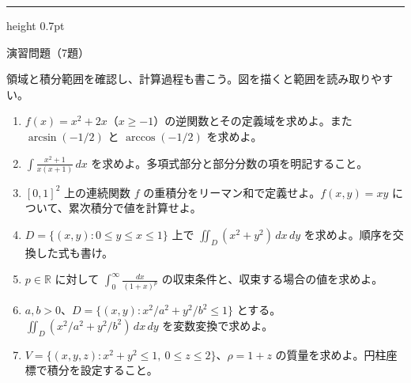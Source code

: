 \documentclass[a4paper,10pt,pdflatex,ja=standard,jafont=ipaex-type1,
  magstyle=real,scale=1]{bxjsarticle}
\newcommand{\topic}[1]{\par\vspace{5pt}%
  {\large\sffamily\mdseries\color{accent}#1}\par\vspace{2pt}}
\newenvironment{problems}
  {\begin{enumerate}[leftmargin=2em,itemsep=3pt,topsep=3pt,parsep=0pt,
    font=\color{accent}]}
  {\end{enumerate}}
\newcommand{\problemspace}{\par\vspace{3mm}}
\newcommand{\exercises}{%
  {\color{accent}\hrule height 0.7pt}\vspace{3pt}%
  \topic{演習問題（7題）}%
  {\small 領域と積分範囲を確認し、計算過程も書こう。図を描くと範囲を読み取りやすい。}\par}
\begin{document}
\noindent\begin{minipage}[b][0.5\textheight][t]{\linewidth}
\exercises
\begin{problems}
\item $f(x)=x^2+2x$（$x\ge-1$）の逆関数とその定義域を求めよ。また $\arcsin(-1/2)$ と $\arccos(-1/2)$ を求めよ。
\problemspace

\item $\displaystyle\int\frac{x^2+1}{x(x+1)}\,dx$ を求めよ。多項式部分と部分分数の項を明記すること。
\problemspace

\item $[0,1]^2$ 上の連続関数 $f$ の重積分をリーマン和で定義せよ。$f(x,y)=xy$ について、累次積分で値を計算せよ。
\problemspace

\item $D=\{(x,y):0\le y\le x\le1\}$ 上で $\iint_D(x^2+y^2)\,dx\,dy$ を求めよ。順序を交換した式も書け。
\problemspace

\item $p\in\mathbb R$ に対して $\displaystyle\int_0^\infty\frac{dx}{(1+x)^p}$ の収束条件と、収束する場合の値を求めよ。
\problemspace

\item $a,b>0$、$D=\{(x,y):x^2/a^2+y^2/b^2\le1\}$ とする。$\iint_D(x^2/a^2+y^2/b^2)\,dx\,dy$ を変数変換で求めよ。
\problemspace

\item $V=\{(x,y,z):x^2+y^2\le1,\ 0\le z\le2\}$、$\rho=1+z$ の質量を求めよ。円柱座標で積分を設定すること。
\problemspace
\end{problems}
\end{minipage}
\end{document}
